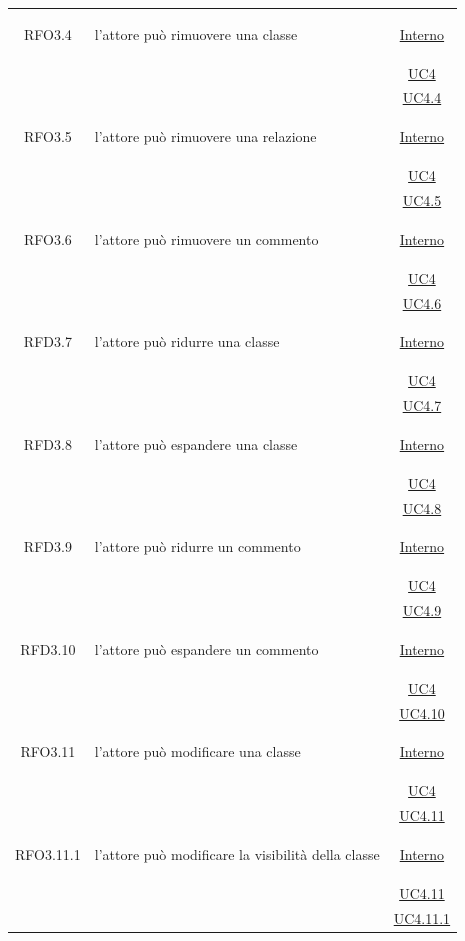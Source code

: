 \begin{longtable}{|c|>{\centering}m{7cm}|c|}
\hypertarget{RFO3.4}{RFO3.4} & l'attore può rimuovere una classe &  \hyperlink{Interno}{Interno}\\
& &\hyperref[UC4]{UC4}\\
& &\hyperref[UC4.4]{UC4.4}\\ \hline

\hypertarget{RFO3.5}{RFO3.5} & l'attore può rimuovere una relazione &  \hyperlink{Interno}{Interno}\\
& &\hyperref[UC4]{UC4}\\
& &\hyperref[UC4.5]{UC4.5}\\ \hline

\hypertarget{RFO3.6}{RFO3.6} & l'attore può rimuovere un commento &  \hyperlink{Interno}{Interno}\\
& &\hyperref[UC4]{UC4}\\
& &\hyperref[UC4.6]{UC4.6}\\ \hline

\hypertarget{RFD3.7}{RFD3.7} & l'attore può ridurre una classe &  \hyperlink{Interno}{Interno}\\
& &\hyperref[UC4]{UC4}\\
& &\hyperref[UC4.7]{UC4.7}\\ \hline

\hypertarget{RFD3.8}{RFD3.8} & l'attore può espandere una classe &  \hyperlink{Interno}{Interno}\\
& &\hyperref[UC4]{UC4}\\
& &\hyperref[UC4.8]{UC4.8}\\ \hline

\hypertarget{RFD3.9}{RFD3.9} & l'attore può ridurre un commento &  \hyperlink{Interno}{Interno}\\
& &\hyperref[UC4]{UC4}\\
& &\hyperref[UC4.9]{UC4.9}\\ \hline

\hypertarget{RFD3.10}{RFD3.10} & l'attore può espandere un commento &  \hyperlink{Interno}{Interno}\\
& &\hyperref[UC4]{UC4}\\
& &\hyperref[UC4.10]{UC4.10}\\ \hline

\hypertarget{RFO3.11}{RFO3.11} & l'attore può modificare una classe &  \hyperlink{Interno}{Interno}\\
& &\hyperref[UC4]{UC4}\\
& &\hyperref[UC4.11]{UC4.11}\\ \hline

\hypertarget{RFO3.11.1}{RFO3.11.1} & l'attore può modificare la visibilità della classe &  \hyperlink{Interno}{Interno}\\
& &\hyperref[UC4.11]{UC4.11}\\
& &\hyperref[UC4.11.1]{UC4.11.1}\\ \hline


\end{longtable}
